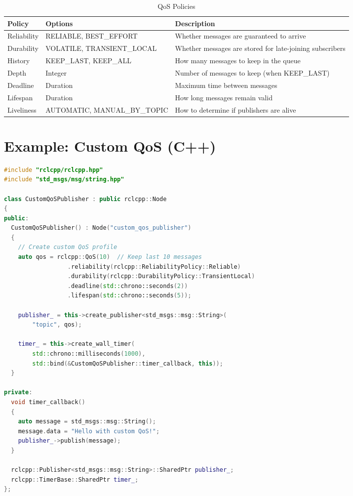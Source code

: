 \documentclass[a4paper,12pt]{book}
\begin{document}
\begin{table}[H]
\centering
\begin{tabular}{|l|p{3cm}|p{7cm}|}
\hline
\textbf{Policy} & \textbf{Options} & \textbf{Description} \\
\hline
Reliability & RELIABLE, BEST\_EFFORT & Whether messages are guaranteed to arrive \\
\hline
Durability & VOLATILE, TRANSIENT\_LOCAL & Whether messages are stored for late-joining subscribers \\
\hline
History & KEEP\_LAST, KEEP\_ALL & How many messages to keep in the queue \\
\hline
Depth & Integer & Number of messages to keep (when KEEP\_LAST) \\
\hline
Deadline & Duration & Maximum time between messages \\
\hline
Lifespan & Duration & How long messages remain valid \\
\hline
Liveliness & AUTOMATIC, MANUAL\_BY\_TOPIC & How to determine if publishers are alive \\
\hline
\end{tabular}
\caption{QoS Policies}
\label{tab:qos_policies}
\end{table}

\section{Example: Custom QoS (C++)}

\begin{lstlisting}[language=CPP, caption=Custom QoS Settings in C++]
#include "rclcpp/rclcpp.hpp"
#include "std_msgs/msg/string.hpp"

class CustomQoSPublisher : public rclcpp::Node
{
public:
  CustomQoSPublisher() : Node("custom_qos_publisher")
  {
    // Create custom QoS profile
    auto qos = rclcpp::QoS(10)  // Keep last 10 messages
                  .reliability(rclcpp::ReliabilityPolicy::Reliable)
                  .durability(rclcpp::DurabilityPolicy::TransientLocal)
                  .deadline(std::chrono::seconds(2))
                  .lifespan(std::chrono::seconds(5));

    publisher_ = this->create_publisher<std_msgs::msg::String>(
        "topic", qos);
        
    timer_ = this->create_wall_timer(
        std::chrono::milliseconds(1000),
        std::bind(&CustomQoSPublisher::timer_callback, this));
  }

private:
  void timer_callback()
  {
    auto message = std_msgs::msg::String();
    message.data = "Hello with custom QoS!";
    publisher_->publish(message);
  }
  
  rclcpp::Publisher<std_msgs::msg::String>::SharedPtr publisher_;
  rclcpp::TimerBase::SharedPtr timer_;
};
\end{lstlisting}
\end{document}
